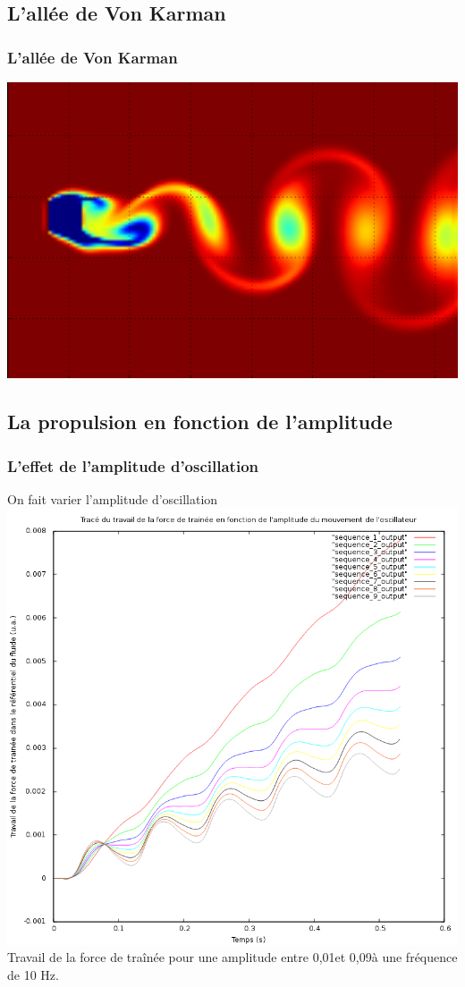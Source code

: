 \documentclass{beamer}
\begin{document}
 \subsection{L'allée de Von Karman}
 \begin{frame}
   \frametitle{L'allée de Von Karman}
   \centering \includegraphics[height= 0.7 \textheight]{VK_pas_mal.png}	
 \end{frame}
 
 \subsection{La propulsion en fonction de l'amplitude}
 		
 \begin{frame}
   \frametitle{L'effet de l'amplitude d'oscillation}
   On fait varier l'amplitude d'oscillation
   \centering \includegraphics[height= 0.6 \textheight]{9courbes.png}\\
   Travail de la force de traînée pour une amplitude entre 0,01\degre et 0,09\degre à une fréquence de 10 Hz.
 \end{frame}
 	
\end{document}
